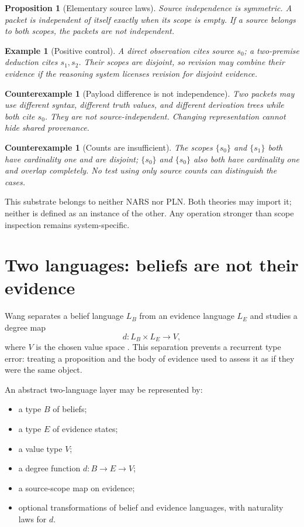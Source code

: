 \documentclass[11pt]{article}
\newtheorem{proposition}[definition]{Proposition}
\newtheorem{example}[definition]{Example}
\newtheorem{counterexample}[definition]{Counterexample}
\theoremstyle{remark}
\begin{document}
\begin{proposition}[Elementary source laws]
Source independence is symmetric.  A packet is independent of itself exactly
when its scope is empty.  If a source belongs to both scopes, the packets are
not independent.
\end{proposition}

\begin{example}[Positive control]
A direct observation cites source $s_0$; a two-premise deduction cites
$s_1,s_2$.  Their scopes are disjoint, so revision may combine their evidence
if the reasoning system licenses revision for disjoint evidence.
\end{example}

\begin{counterexample}[Payload difference is not independence]
Two packets may use different syntax, different truth values, and different
derivation trees while both cite $s_0$.  They are not source-independent.
Changing representation cannot hide shared provenance.
\end{counterexample}

\begin{counterexample}[Counts are insufficient]
The scopes $\{s_0\}$ and $\{s_1\}$ both have cardinality one and are disjoint;
$\{s_0\}$ and $\{s_0\}$ also both have cardinality one and overlap completely.
No test using only source counts can distinguish the cases.
\end{counterexample}

This substrate belongs to neither NARS nor PLN.  Both theories may import it;
neither is defined as an instance of the other.  Any operation stronger than
scope inspection remains system-specific.

\section{Two languages: beliefs are not their evidence}

Wang separates a belief language $L_B$ from an evidence language $L_E$ and
studies a degree map
\[
  d : L_B \times L_E \longrightarrow V,
\]
where $V$ is the chosen value space \cite{wang2009}.  This separation prevents
a recurrent type error: treating a proposition and the body of evidence used
to assess it as if they were the same object.

An abstract two-language layer may be represented by:
\begin{itemize}
  \item a type $B$ of beliefs;
  \item a type $E$ of evidence states;
  \item a value type $V$;
  \item a degree function $d:B\to E\to V$;
  \item a source-scope map on evidence;
  \item optional transformations of belief and evidence languages, with
        naturality laws for $d$.
\end{itemize}
\end{document}
